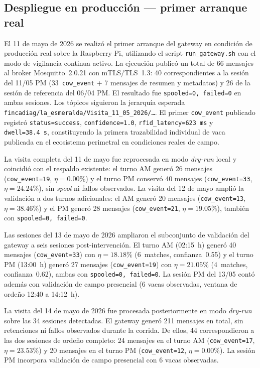 \subsection{Despliegue en producción — primer arranque real}

El 11 de mayo de 2026 se realizó el primer arranque del gateway en condición de producción real sobre la Raspberry Pi, utilizando el script \texttt{run\_gateway.sh} con el modo de vigilancia continua activo. La ejecución publicó un total de 66 mensajes al broker Mosquitto~2.0.21 con mTLS/TLS~1.3: 40 correspondientes a la sesión del 11/05 PM (33~\texttt{cow\_event} + 7 mensajes de resumen y metadatos) y 26 de la sesión de referencia del 06/04 PM. El resultado fue \texttt{spooled=0, failed=0} en ambas sesiones. Los tópicos siguieron la jerarquía esperada \texttt{fincadiag/la\_esmeralda/Visita\_11\_05\_2026/\ldots}. El primer \texttt{cow\_event} publicado registró \texttt{status=success}, \texttt{confidence=1.0}, \texttt{rfid\_latency=623~ms} y \texttt{dwell=38.4~s}, constituyendo la primera trazabilidad individual de vaca publicada en el ecosistema perimetral en condiciones reales de campo.

La visita completa del 11 de mayo fue reprocesada en modo \textit{dry-run} local y coincidió con el respaldo existente: el turno AM generó 26 mensajes (\texttt{cow\_event=19}, $\eta=0.00\%$) y el turno PM conservó 40 mensajes (\texttt{cow\_event=33}, $\eta=24.24\%$), sin \textit{spool} ni fallos observados. La visita del 12 de mayo amplió la validación a dos turnos adicionales: el AM generó 20 mensajes (\texttt{cow\_event=13}, $\eta=38.46\%$) y el PM generó 28 mensajes (\texttt{cow\_event=21}, $\eta=19.05\%$), también con \texttt{spooled=0, failed=0}.

Las sesiones del 13 de mayo de 2026 ampliaron el subconjunto de validación del gateway a seis sesiones post-intervención. El turno AM (02:15~h) generó 40 mensajes (\texttt{cow\_event=33}) con $\eta=18.18\%$ (6~matches, confianza~0.55) y el turno PM (13:00~h) generó 27 mensajes (\texttt{cow\_event=19}) con $\eta=21.05\%$ (4~matches, confianza~0.62), ambas con \texttt{spooled=0, failed=0}. La sesión PM del 13/05 contó además con validación de campo presencial (6 vacas observadas, ventana de ordeño 12:40 a 14:12~h).

La visita del 14 de mayo de 2026 fue procesada posteriormente en modo \textit{dry-run} sobre las 34 sesiones detectadas. El gateway generó 211 mensajes en total, sin retenciones ni fallos observados durante la corrida. De ellos, 44 correspondieron a las dos sesiones de ordeño completo: 24 mensajes en el turno AM (\texttt{cow\_event=17}, $\eta=23.53\%$) y 20 mensajes en el turno PM (\texttt{cow\_event=12}, $\eta=0.00\%$). La sesión PM incorpora validación de campo presencial con 6 vacas observadas.

